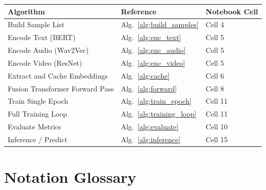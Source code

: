 \documentclass[12pt,a4paper]{article}
\theoremstyle{definition}
\begin{document}
\begin{center}
\begin{tabular}{lll}
\toprule
\textbf{Algorithm} & \textbf{Reference} & \textbf{Notebook Cell} \\
\midrule
Build Sample List & Alg.~\ref{alg:build_samples} & Cell 4 \\
Encode Text (BERT) & Alg.~\ref{alg:enc_text} & Cell 5 \\
Encode Audio (Wav2Vec) & Alg.~\ref{alg:enc_audio} & Cell 5 \\
Encode Video (ResNet) & Alg.~\ref{alg:enc_video} & Cell 5 \\
Extract and Cache Embeddings & Alg.~\ref{alg:cache} & Cell 6 \\
Fusion Transformer Forward Pass & Alg.~\ref{alg:forward} & Cell 8 \\
Train Single Epoch & Alg.~\ref{alg:train_epoch} & Cell 11 \\
Full Training Loop & Alg.~\ref{alg:training_loop} & Cell 11 \\
Evaluate Metrics & Alg.~\ref{alg:evaluate} & Cell 10 \\
Inference / Predict & Alg.~\ref{alg:inference} & Cell 15 \\
\bottomrule
\end{tabular}
\end{center}

\appendix
\section{Notation Glossary}
\end{document}
